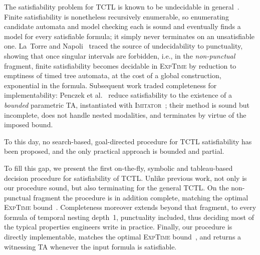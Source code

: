 The satisfiability problem for TCTL is known to be undecidable in
general~\cite{AlurCourcoubetisDill1990,AlurHenzinger1994ReallyTemporal}. Finite
satisfiability is nonetheless recursively
enumerable, so enumerating candidate automata and model checking each is sound
and eventually finds a model for every satisfiable formula; it simply never
terminates on an unsatisfiable one. La~Torre and
Napoli~\cite{fsttcs2000-LN,LaTorreNapoli2001TimedTreeAutomata} traced the source
of undecidability to punctuality, showing that once singular intervals are
forbidden, i.e., in the \emph{non-punctual} fragment, finite satisfiability
becomes decidable in \textsc{ExpTime} by reduction to emptiness of timed tree
automata, at the cost of a global construction, exponential in the formula. Subsequent work traded completeness
for implementability: Penczek et al.~\cite{boundedTCTL} reduce satisfiability to
the existence of a \emph{bounded} parametric TA, instantiated with
\textsc{Imitator}~\cite{imitator3}; their method is sound but incomplete, does not
handle nested modalities, and terminates by virtue of the imposed bound.

To this day, no search-based, goal-directed procedure for TCTL satisfiability has been proposed, and the only practical approach is bounded and partial. 

%
%

To fill this gap, we present the first on-the-fly, symbolic and tableau-based
decision procedure for satisfiability of TCTL. Unlike previous work, not only is our procedure sound, but also terminating for the general TCTL. On the non-punctual fragment the procedure is in
addition complete, matching the optimal \textsc{ExpTime}
bound~\cite{Clarke99,fsttcs2000-LN}. Completeness moreover extends
beyond that fragment, to every formula of temporal nesting depth~1, punctuality
included, thus deciding most of the typical properties engineers write in practice. Finally, our procedure is directly implementable, matches the optimal \textsc{ExpTime} bound~\cite{LaTorreNapoli2001TimedTreeAutomata}, and returns a witnessing TA whenever the input formula is satisfiable.

